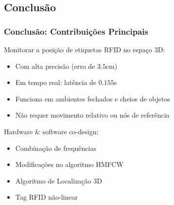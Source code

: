 \subsection{Conclusão}

\begin{frame}
  \frametitle{Conclusão: Contribuições Principais}

    Monitorar a posição de etiquetas RFID no espaço 3D:

    \begin{itemize}
      \item Com \alert{alta precisão} (erro de $3.5$cm)
      \item Em \alert{tempo real}: latência de $0.155$s
      \item Funciona em \alert{ambientes fechados e cheios de objetos}
      \item \alert{Não requer movimento relativo} ou \alert{nós de referência}
    \end{itemize}

    Hardware \& software co-design:

    \begin{itemize}
        \item \alert{Combinação de frequências}
        \item \alert{Modificações no algoritmo HMFCW}
        \item Algoritmo de \alert{Localização 3D}
        \item \alert{Tag RFID não-linear}
    \end{itemize}
\end{frame}

